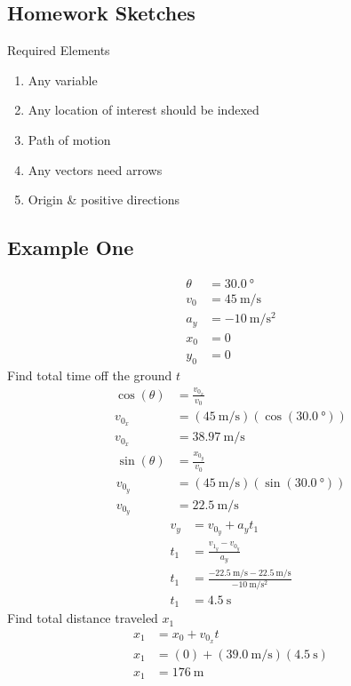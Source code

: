 \documentclass{article}
\begin{document}
\subsection{Homework Sketches}

Required Elements
\begin{enumerate}
	\item
		Any variable
	\item
		Any location of interest should be indexed
	\item
		Path of motion
	\item
		Any vectors need arrows
	\item
		Origin \& positive directions
\end{enumerate}

\subsection{Example One}

\begin{align*}
	\theta & = \SI{30.0}{\degree} \\
	v_0 & = \SI{45}{\meter \per \second} \\
	a_y & = \SI{-10}{\meter \per \second \squared} \\
	x_0 & = 0 \\
	y_0 & = 0
\end{align*}
Find total time off the ground $ t $
\begin{align*}
	\cos(\theta) & = \frac{v_{0_x}}{v_0} \\
	v_{0_x} & = (\SI{45}{\meter \per \second})(\cos(\SI{30.0}{\degree})) \\
	v_{0_x} & = \SI{38.97}{\meter \per \second}
\end{align*}
\begin{align*}
	\sin(\theta) & = \frac{x_{0_y}}{v_0} \\
	v_{0_y} & = (\SI{45}{\meter \per \second})(\sin(\SI{30.0}{\degree})) \\
	v_{0_y} & = \SI{22.5}{\meter \per \second}
\end{align*}
\begin{align*}
	v_y & = v_{0_y} + a_yt_1 \\
	t_1 & = \frac{v_{1_y} - v_{0_y}}{a_y} \\
	t_1 & = \frac{\SI{-22.5}{\meter \per \second} - \SI{22.5}{\meter \per \second}}{\SI{-10}{\meter \per \second \squared}} \\
	t_1 & = \SI{4.5}{\second}
\end{align*}
Find total distance traveled $ x_1 $
\begin{align*}
	x_1 & = x_0 + v_{0_x}t \\
	x_1 & = (0) + (\SI{39.0}{\meter \per \second})(\SI{4.5}{\second}) \\
	x_1 & = \SI{176}{\meter}
\end{align*}
\end{document}
